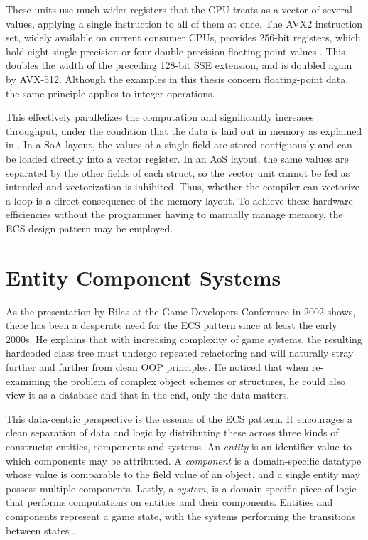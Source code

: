 These units use much wider registers that the CPU treats as a vector of several values, applying a single instruction to all of them at once. The AVX2 instruction set, widely available on current consumer CPUs, provides \num{256}-bit registers, which hold eight single-precision or four double-precision floating-point values \cite{intel_sdm}. This doubles the width of the preceding \num{128}-bit SSE extension, and is doubled again by AVX-512. Although the examples in this thesis concern floating-point data, the same principle applies to integer operations.

This effectively parallelizes the computation and significantly increases throughput, under the condition that the data is laid out in memory as explained in .
In a \ac{SoA} layout, the values of a single field are stored contiguously and can be loaded directly into a vector register. In an \ac{AoS} layout, the same values are separated by the other fields of each struct, so the vector unit cannot be fed as intended and vectorization is inhibited. Thus, whether the compiler can vectorize a loop is a direct consequence of the memory layout. To achieve these hardware efficiencies without the programmer having to manually manage memory, the \ac{ECS} design pattern may be employed.

\section{Entity Component Systems}
\label{sec:background:ecs}
As the presentation by Bilas \cite{bilas2002data} at the Game Developers Conference in 2002 shows, there has been a desperate need for the \ac{ECS} pattern since at least the early 2000s. He explains that with increasing complexity of game systems, the resulting hardcoded class tree must undergo repeated refactoring and will naturally stray further and further from clean \ac{OOP} principles. He noticed that when re-examining the problem of complex object schemes or structures, he could also view it as a database and that in the end, only the data matters.

This data-centric perspective is the essence of the \ac{ECS} pattern. It encourages a clean separation of data and logic by distributing these across three kinds of constructs: entities, components and systems. An \emph{entity} is an identifier value to which components may be attributed. A \emph{component} is a domain-specific datatype whose value is comparable to the field value of an object, and a single entity may possess multiple components. Lastly, a \emph{system}, is a domain-specific piece of logic that performs computations on entities and their components. Entities and components represent a game state, with the systems performing the transitions between states \cite{redmond2025ecs}.

